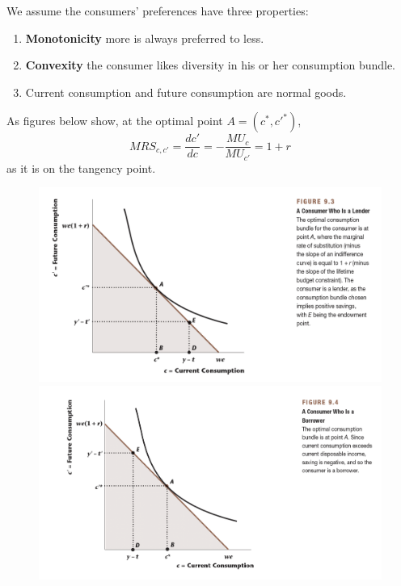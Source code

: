 \documentclass[11pt]{article}
\begin{document}
	\begin{assumption}
		We assume the consumers' preferences have three properties:
		\begin{enumerate}
			\item \textbf{Monotonicity} more is always preferred to less.
			\item \textbf{Convexity} the consumer likes diversity in his or her consumption bundle.
			\item Current consumption and future consumption are normal goods.
		\end{enumerate}
	\end{assumption}
	As figures below show, at the optimal point $A=(c^*, c'^*)$,
		\[
		MRS_{c, c'} = \frac{dc'}{dc} = -\frac{MU_c}{MU_{c'}}= 1 + r
		\]
	as it is on the tangency point.
	\begin{figure}[h]
		\begin{minipage}{0.6\linewidth}
			\centering
			\includegraphics[width=\linewidth]{figures/93}
		\end{minipage}
		\begin{minipage}{0.6\linewidth}
			\centering
			\includegraphics[width=\linewidth]{figures/94}
		\end{minipage}
	\end{figure}
	
\end{document}
